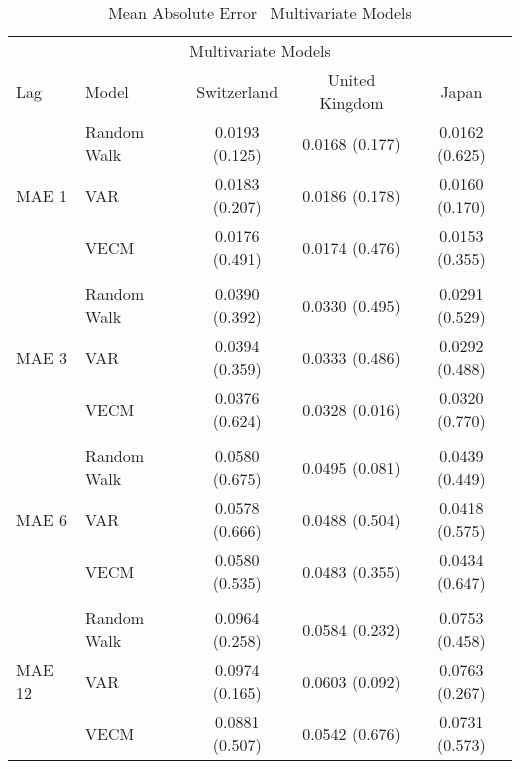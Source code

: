 \begin{table}[!h] %
  \centering
    \caption{Mean Absolute Error \textendash \ Multivariate Models}
  \begin{tabular}{llccc} %
    \toprule
    \multicolumn{5}{c}{Multivariate Models}                      \\
    \cmidrule(r){1-5}
    Lag                           &   Model                                     &Switzerland       & United Kingdom & Japan\\
    \midrule
    \multirow{3}{*}{MAE 1}        & \multicolumn{1}{l}{Random Walk}             &   0.0193 (0.125) & 0.0168 (0.177) & 0.0162 (0.625)\\
                                  & \multicolumn{1}{l}{VAR}                     &   0.0183 (0.207) & 0.0186 (0.178) & 0.0160 (0.170)\\ 
                                  & \multicolumn{1}{l}{VECM}                    &   0.0176 (0.491) & 0.0174 (0.476) & 0.0153 (0.355)\\
    \\
    \multirow{3}{*}{MAE 3}        & \multicolumn{1}{l}{Random Walk}             &   0.0390 (0.392) & 0.0330 (0.495) & 0.0291 (0.529)\\ 
                                  & \multicolumn{1}{l}{VAR}                     &   0.0394 (0.359) & 0.0333 (0.486) & 0.0292 (0.488)\\
                                  & \multicolumn{1}{l}{VECM}                    &   0.0376 (0.624) & 0.0328 (0.016) & 0.0320 (0.770)\\
                                                                             
    \\
    \multirow{3}{*}{MAE 6}        & \multicolumn{1}{l}{Random Walk}             &   0.0580 (0.675) & 0.0495 (0.081) & 0.0439 (0.449)\\
                                  & \multicolumn{1}{l}{VAR}                     &   0.0578 (0.666) & 0.0488 (0.504) & 0.0418 (0.575)\\
                                  & \multicolumn{1}{l}{VECM}                    &   0.0580 (0.535) & 0.0483 (0.355) & 0.0434 (0.647)\\
     \\
    \multirow{3}{*}{MAE 12}       & \multicolumn{1}{l}{Random Walk}             &   0.0964 (0.258) & 0.0584 (0.232) & 0.0753 (0.458)\\
                                  & \multicolumn{1}{l}{VAR}                     &   0.0974 (0.165) & 0.0603 (0.092) & 0.0763 (0.267)\\
                                  & \multicolumn{1}{l}{VECM}                    &   0.0881 (0.507) & 0.0542 (0.676) & 0.0731 (0.573)\\
    \bottomrule
  \end{tabular}
\label{table:MAEmultivariate}
\end{table}


